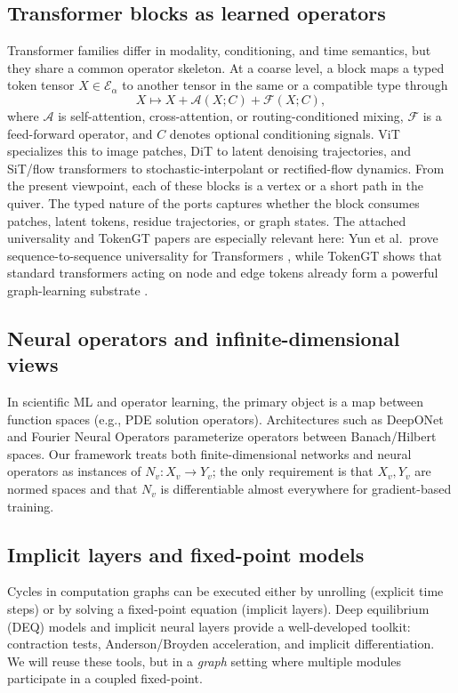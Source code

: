 \documentclass[11pt]{article}
\theoremstyle{definition}
\theoremstyle{plain}
\theoremstyle{remark}
\newcommand{\mc}[1]{\mathcal{#1}}
\newcommand{\Emb}{\mc{E}}
\begin{document}
\subsection{Transformer blocks as learned operators}
\label{sec:prelim-transformers}

Transformer families differ in modality, conditioning, and time semantics, but they share a common operator skeleton.
At a coarse level, a block maps a typed token tensor $X\in\Emb_\alpha$ to another tensor in the same or a compatible type through
\[
X \mapsto X + \mc{A}(X;C) + \mc{F}(X;C),
\]
where $\mc{A}$ is self-attention, cross-attention, or routing-conditioned mixing, $\mc{F}$ is a feed-forward operator, and $C$ denotes optional conditioning signals.
ViT specializes this to image patches, DiT to latent denoising trajectories, and SiT/flow transformers to stochastic-interpolant or rectified-flow dynamics.
From the present viewpoint, each of these blocks is a vertex or a short path in the quiver.
The typed nature of the ports captures whether the block consumes patches, latent tokens, residue trajectories, or graph states.
The attached universality and TokenGT papers are especially relevant here:
Yun et al.\ prove sequence-to-sequence universality for Transformers \cite{YunBhojanapalliRawatKumarReddi2020}, while TokenGT shows that standard transformers acting on node and edge tokens already form a powerful graph-learning substrate \cite{KimNguyenMinChoLeeLeeHong2022}.

\subsection{Neural operators and infinite-dimensional views}
In scientific ML and operator learning, the primary object is a map between function spaces (e.g., PDE solution operators).
Architectures such as DeepONet and Fourier Neural Operators parameterize operators between Banach/Hilbert spaces.
Our framework treats both finite-dimensional networks and neural operators as instances of $N_v: X_v\to Y_v$; the only requirement is that $X_v,Y_v$ are normed spaces and that $N_v$ is differentiable almost everywhere for gradient-based training.

\subsection{Implicit layers and fixed-point models}
Cycles in computation graphs can be executed either by unrolling (explicit time steps) or by solving a fixed-point equation (implicit layers).
Deep equilibrium (DEQ) models and implicit neural layers provide a well-developed toolkit: contraction tests, Anderson/Broyden acceleration, and implicit differentiation.
We will reuse these tools, but in a \emph{graph} setting where multiple modules participate in a coupled fixed-point.
\end{document}
